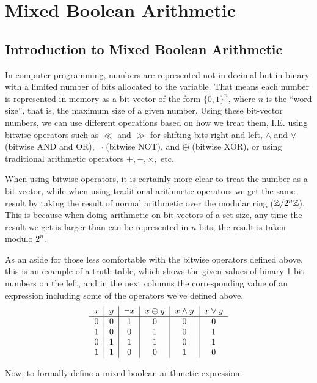 \section{Mixed Boolean Arithmetic}
\subsection{Introduction to Mixed Boolean Arithmetic}
In computer programming, numbers are represented
not in decimal but in binary with a limited number of bits allocated to the 
variable. That means each number is represented in memory as a bit-vector of
the form $\{0,1\}^n$, where $n$ is the ``word size'', that is, the maximum 
size of a given number. Using these bit-vector numbers, we can use different
operations based on how we treat them, I.E. using bitwise operators such as
$\ll$ and $\gg$ for shifting bits right and left, $\land$ and $\lor$ (bitwise AND and OR), $\neg$ (bitwise NOT), 
and $\oplus$ (bitwise XOR), or using traditional arithmetic operators $+, -, \times,$ etc.
\par When using bitwise operators, it is certainly more clear to treat the 
number as a bit-vector, while when using traditional arithmetic operators
we get the same result by taking the result of normal arithmetic over the modular ring 
($\mathbb{Z}/2^n\mathbb{Z}$). This is because when doing arithmetic on bit-vectors of a set size, 
any time the result we get is larger than can be represented in $n$ bits, the result
is taken modulo $2^n$.
\par As an aside for those less comfortable with the bitwise operators defined above, 
this is an example of a truth table, which shows the given values of binary 1-bit
numbers on the left, and in the next columns the corresponding value of an 
expression including some of the operators we've defined above.
\begin{align*}
    \begin{tabular}{c|c|c|c|c|c}
        $x$ & $y$ & $\neg x$ & $x \oplus y$ & $x \land y$ & $x \lor y$\\
        \hline
        0 & 0 & 1 & 0 & 0 & 0\\
        1 & 0 & 0 & 1 & 0 & 1\\
        0 & 1 & 1 & 1 & 0 & 1\\
        1 & 1 & 0 & 0 & 1 & 0\\
    \end{tabular}
\end{align*}
\par Now, to formally define a mixed boolean arithmetic expression:
